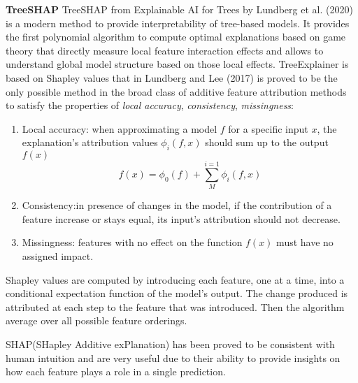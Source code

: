 \textbf{TreeSHAP}
TreeSHAP from Explainable AI for Trees by Lundberg et al. (2020) \cite{treeshap} is a modern method to provide interpretability of tree-based models. It provides the first polynomial algorithm to compute optimal explanations based on game theory that directly measure local feature interaction effects and allows to understand global model structure based on those local effects. TreeExplainer is based on Shapley values that in Lundberg and Lee (2017)\cite{shap} is proved to be the only possible method in the broad class of additive feature attribution methods to satisfy the properties of \emph{local accuracy}, \emph{consistency},  \emph{missingness}:
\begin{enumerate}
    \item Local accuracy: when approximating a model $f$ for a specific input $x$, the explanation’s attribution values $\phi_i(f,x)$ should sum up to the output $f(x)$
    \begin{equation}
        f(x) = \phi_0(f) + \sum_{M}^{i=1}\phi_i(f,x)
    \end{equation}
    \item Consistency:in presence of changes in the model, if the contribution of a feature increase or stays equal, its input's attribution should not decrease.
    \item Missingness: features with no effect on the function $f(x)$ must have no assigned impact.
\end{enumerate}
Shapley values are computed by introducing each feature, one at a time, into a conditional expectation function of the model’s output. The change produced is attributed at each step to the feature that was introduced. Then the algorithm average over all possible feature
orderings.

SHAP(SHapley Additive exPlanation) has been proved to be consistent with human intuition and are very useful due to their ability to provide insights on how each feature plays a role in a single prediction.



